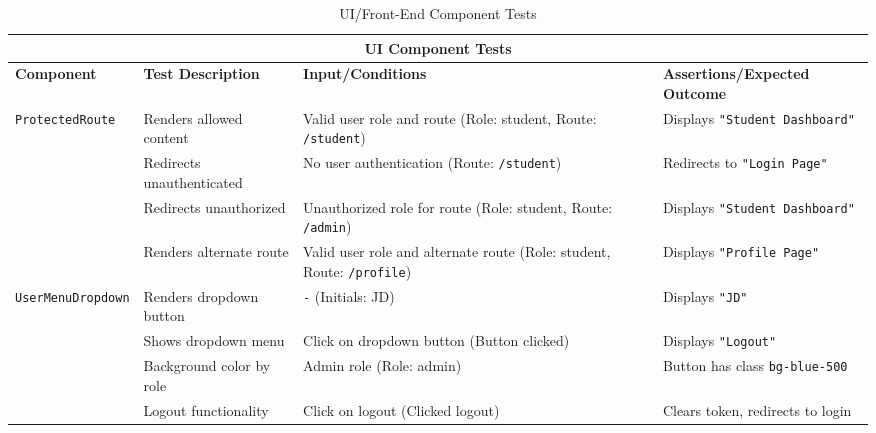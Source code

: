 \begin{table}[ht]
\centering
\begin{tabular}{|p{3.4cm}|p{4cm}|p{4cm}|p{5cm}|}
\hline
\multicolumn{4}{|c|}{\textbf{UI Component Tests}} \\
\hline
\textbf{Component} & \textbf{Test Description} & \textbf{Input/Conditions} & \textbf{Assertions/Expected Outcome} \\
\hline
\multirow{4}{*}{\texttt{ProtectedRoute}}
 & Renders allowed content      
 & Valid user role and route (Role: student, Route: \texttt{/student}) 
 & Displays \texttt{"Student Dashboard"} \\ \cline{2-4}
 & Redirects unauthenticated   
 & No user authentication (Route: \texttt{/student})
 & Redirects to \texttt{"Login Page"} \\ \cline{2-4}
 & Redirects unauthorized      
 & Unauthorized role for route (Role: student, Route: \texttt{/admin})
 & Displays \texttt{"Student Dashboard"} \\ \cline{2-4}
 & Renders alternate route     
 & Valid user role and alternate route (Role: student, Route: \texttt{/profile})
 & Displays \texttt{"Profile Page"} \\
\hline
\multirow{4}{*}{\texttt{UserMenuDropdown}}
 & Renders dropdown button     
 & \texttt{-} (Initials: JD)
 & Displays \texttt{"JD"} \\ \cline{2-4}
 & Shows dropdown menu         
 & Click on dropdown button (Button clicked)
 & Displays \texttt{"Logout"} \\ \cline{2-4}
 & Background color by role    
 & Admin role (Role: admin)
 & Button has class \texttt{bg-blue-500} \\ \cline{2-4}
 & Logout functionality        
 & Click on logout (Clicked logout)
 & Clears token, redirects to login \\
\hline
\end{tabular}
\caption{UI/Front-End Component Tests}
\label{tab:ui_component_tests}
\end{table}

